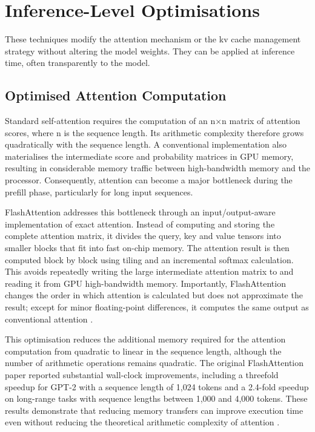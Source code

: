 \section{Inference-Level Optimisations}\label{sec:inference_opts}

These techniques modify the attention mechanism or the \ac{kv} cache management strategy without altering the model weights. They can be applied at inference time, often transparently to the model.

\subsection{Optimised Attention Computation}
\label{sec:optimised-attention}

Standard self-attention requires the computation of an n×n matrix of attention scores, where n is the sequence length. Its arithmetic complexity therefore grows quadratically with the sequence length. A conventional implementation also materialises the intermediate score and probability matrices in GPU memory, resulting in considerable memory traffic between high-bandwidth memory and the processor. Consequently, attention can become a major bottleneck during the prefill phase, particularly for long input sequences.

FlashAttention addresses this bottleneck through an input/output-aware implementation of exact attention. Instead of computing and storing the complete attention matrix, it divides the query, key and value tensors into smaller blocks that fit into fast on-chip memory. The attention result is then computed block by block using tiling and an incremental softmax calculation. This avoids repeatedly writing the large intermediate attention matrix to and reading it from GPU high-bandwidth memory. Importantly, FlashAttention changes the order in which attention is calculated but does not approximate the result; except for minor floating-point differences, it computes the same output as conventional attention \cite{dao2022flashattention}.

This optimisation reduces the additional memory required for the attention computation from quadratic to linear in the sequence length, although the number of arithmetic operations remains quadratic. The original FlashAttention paper reported substantial wall-clock improvements, including a threefold speedup for GPT-2 with a sequence length of 1,024 tokens and a 2.4-fold speedup on long-range tasks with sequence lengths between 1,000 and 4,000 tokens. These results demonstrate that reducing memory transfers can improve execution time even without reducing the theoretical arithmetic complexity of attention \cite{dao2022flashattention}.



